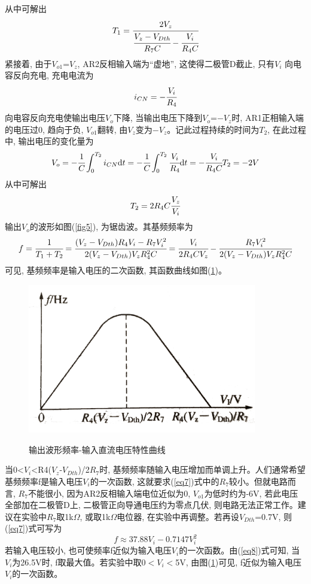 \documentclass[a4paper]{article}
\begin{document}
从中可解出
\begin{equation}
T_1 = \cfrac{2V_z}{\cfrac{V_z - V_{Dth}}{R_7C} - \cfrac{V_i}{R_4C}}\label{eq3}
\end{equation}
紧接着, 由于$V_{o1}$=$V_z$, AR2反相输入端为“虚地”, 这使得二极管D截止, 只有$V_i$ 向电容反向充电, 充电电流为
\begin{equation}
i_{CN} = -\cfrac{V_i}{R_4}\label{eq4}
\end{equation}
向电容反向充电使输出电压$V_o$下降, 当输出电压下降到$V_o$=$-V_z$时, AR1正相输入端的电压过0, 趋向于负, $V_{o1}$翻转, 由$V_z$变为$-V_z$。记此过程持续的时间为$T_2$, 在此过程中, 输出电压的变化量为
\begin{equation}
V_o = -\cfrac{1}{C}\int^{T_2}_{0}i_{CN}\text{d}t = -\cfrac{1}{C}\int^{T_2}_{0}\cfrac{V_i}{R_4}\text{d}t = -\cfrac{V_i}{R_4C}T_2 = -2V\label{eq5}
\end{equation}
从中可解出
\begin{equation}
T_2 = 2R_4C\cfrac{V_z}{V_i}\label{eq6}
\end{equation}
输出$V_o$的波形如图(\ref{fig5}), 为锯齿波。其基频频率为
\begin{equation}
f = \cfrac{1}{T_1+T_2} = \cfrac{(V_z - V_{Dth})R_4V_i - R_7V_i^2}{2(V_z - V_{Dth})V_zR_4^2C} = \cfrac{V_i}{2R_4CV_z} - \cfrac{R_7V_i^2}{2(V_z - V_{Dth})V_zR_4^2C}\label{eq7}
\end{equation}
可见, 基频频率是输入电压的二次函数, 其函数曲线如图(\ref{fig6})。

\begin{figure}[!h]
\centering
\includegraphics[width=10cm]{fig/fig6.jpg}\\
\caption{输出波形频率-输入直流电压特性曲线}\label{fig6}    
\end{figure}

当0<$V_i$<R4($V_z$-$V_{Dth}$)/2$R_7$时, 基频频率随输入电压增加而单调上升。人们通常希望基频频率f是输入电压$V_i$的一次函数, 这就要求(\ref{eq7})式中的$R_7$较小。但就电路而言, $R_7$不能很小, 因为AR2反相输入端电位近似为0, $V_{o1}$为低时约为-6V, 若此电压全部加在二极管D上, 二极管正向导通电压约为零点几伏, 则电路无法正常工作。建议在实验中$R_7$取1k$\Omega$, 或取1k$\Omega$电位器, 在实验中再调整。若再设$V_{Dth}$=0.7V, 则(\ref{eq7})式可写为
\begin{equation}
f \approx 37.88V_i - 0.7147V_i^2\label{eq8}
\end{equation}
若输入电压较小, 也可使频率f近似为输入电压$V_i$的一次函数。由(\ref{eq8})式可知, 当$V_i$为26.5V时, f取最大值。若实验中取0$<V_i<$5V, 由图(\ref{fig6})可见, f近似为输入电压$V_i$的一次函数。
\end{document}
